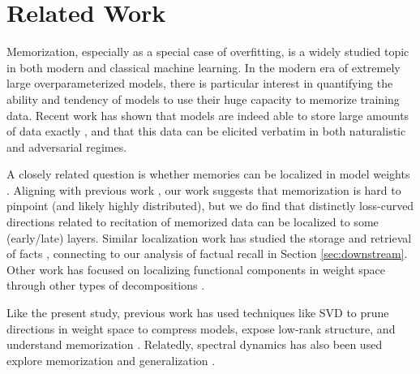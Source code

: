 \documentclass{article} %
\begin{document}
\section{Related Work}
\label{sec:related_work}

Memorization, especially as a special case of overfitting, is a widely studied topic in both modern and classical machine learning. In the modern era of extremely large overparameterized models, there is particular interest in quantifying the ability and tendency of models to use their huge capacity to memorize training data. Recent work has shown that models are indeed able to store large amounts of data exactly \citep{morris2025much}, and that this data can be elicited verbatim in both naturalistic \citep{aerni2024measuringnonadversarialreproductiontraining} and adversarial \citep{carlini2022quantifying, karamolegkou2023copyright} regimes. 

A closely related question is whether memories can be localized in model weights \citep{maini2023can, chang2024localization, stoehr2024localizing, huang2024demystifying}. Aligning with previous work \citep{hase2023does, karamolegkou2023copyright}, our work suggests that memorization is hard to pinpoint (and likely highly distributed), but we do find that distinctly loss-curved directions related to recitation of memorized data can be localized to some (early/late) layers. Similar localization work has studied the storage and retrieval of facts \citep{geva2021transformer, gur2025precise, meng2022locating, dai2022knowledge, factfinding,merullo2024language, menta2025analyzing}, connecting to our analysis of factual recall in Section \ref{sec:downstream}. Other work has focused on localizing functional components in weight space through other types of decompositions \citep{baker2025structuralinferenceinterpretingsmall, bushnaq2025stochastic}.

Like the present study, previous work has used techniques like SVD to prune directions in weight space to compress models, expose low-rank structure, and understand memorization \citep{zhaogalore, jaiswallow, sharmatruth}. Relatedly, spectral dynamics has also been used explore memorization and generalization \citep{yunis2024approaching}.
\end{document}

